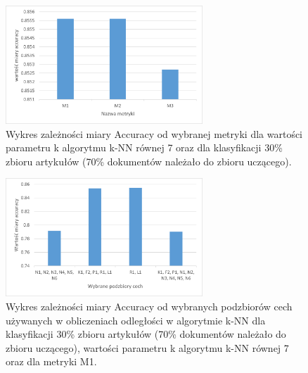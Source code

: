 \documentclass{classrep}
\begin{document}
\begin{figure}[H]
\centering
\includegraphics[width=0.66\textwidth]{wykres7.png}
\caption{Wykres zależności miary Accuracy od wybranej metryki dla wartości parametru k algorytmu k-NN równej 7 oraz dla klasyfikacji 30\% zbioru artykułów (70\% dokumentów należało do zbioru uczącego).}
\end{figure}

\begin{figure}[H]
\centering
\includegraphics[width=0.66\textwidth]{wykres8.png}
\caption{Wykres zależności miary Accuracy od wybranych podzbiorów cech używanych w obliczeniach odległości w algorytmie k-NN dla klasyfikacji 30\% zbioru artykułów (70\% dokumentów należało do zbioru uczącego), wartości parametru k algorytmu k-NN równej 7 oraz dla metryki M1.}
\end{figure}
\end{document}
